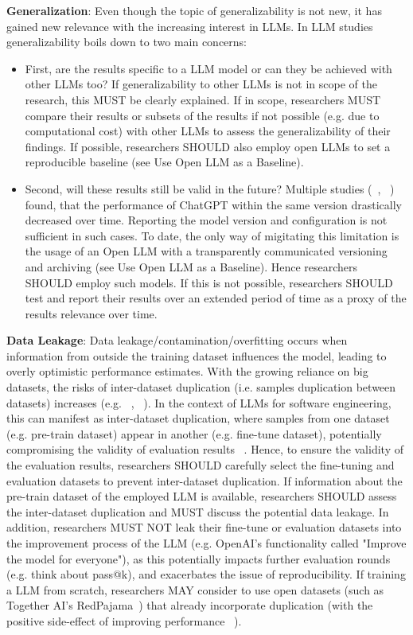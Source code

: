 \documentclass[11pt]{article}
\begin{document}
\textbf{Generalization}:
Even though the topic of generalizability is not new, it has gained new relevance with the increasing interest in LLMs. In LLM studies generalizability boils down to two main concerns: 
\begin{itemize}
  \item First, are the results specific to a LLM model or can they be achieved with other LLMs too? If generalizability to other LLMs is not in scope of the research, this MUST be clearly explained. If in scope, researchers MUST compare their results or subsets of the results if not possible (e.g. due to computational cost) with other LLMs to assess the generalizability of their findings. If possible, researchers SHOULD also employ open LLMs to set a reproducible baseline (see Use Open LLM as a Baseline).
  \item Second, will these results still be valid in the future? Multiple studies (~\cite{DBLP:journals/corr/abs-2307-09009}, ~\cite{doi:10.1148/radiol.232411}) found, that the performance of ChatGPT within the same version drastically decreased over time. Reporting the model version and configuration is not sufficient in such cases. To date, the only way of migitating this limitation is the usage of an Open LLM with a transparently communicated versioning and archiving (see Use Open LLM as a Baseline). Hence researchers SHOULD employ such models. If this is not possible, researchers SHOULD test and report their results over an extended period of time as a proxy of the results relevance over time.
\end{itemize}

\textbf{Data Leakage}:
Data leakage/contamination/overfitting occurs when information from outside the training dataset influences the model, leading to overly optimistic performance estimates. With the growing reliance on big datasets, the risks of inter-dataset duplication (i.e. samples duplication between datasets) increases (e.g. ~\cite{10.1145/3133908}, ~\cite{10.1145/3359591.3359735}). 
In the context of LLMs for software engineering, this can manifest as inter-dataset duplication, where samples from one dataset (e.g. pre-train dataset) appear in another (e.g. fine-tune dataset), potentially compromising the validity of evaluation results ~\cite{inter-dataset-lopez2025}. 
Hence, to ensure the validity of the evaluation results, researchers SHOULD carefully select the fine-tuning and evaluation datasets to prevent inter-dataset duplication. If information about the pre-train dataset of the employed LLM is available, researchers SHOULD assess the inter-dataset duplication and MUST discuss the potential data leakage.
In addition, researchers MUST NOT leak their fine-tune or evaluation datasets into the improvement process of the LLM (e.g. OpenAI's functionality called "Improve the model for everyone"), as this potentially impacts further evaluation rounds (e.g. think about pass@k), and exacerbates the issue of reproducibility.
If training a LLM from scratch, researchers MAY consider to use open datasets (such as Together AI's RedPajama~\cite{together2023redpajama}) that already incorporate duplication (with the positive side-effect of improving performance ~\cite{lee-etal-2022-deduplicating}).
\end{document}
